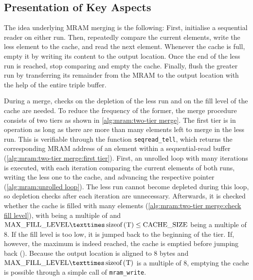 \subsection{Presentation of Key Aspects}
\label{sec:mram:merge:presentation}

The idea underlying \ac{MRAM} merging is the following:
First, initialise a sequential reader on either run.
Then, repeatedly compare the current elements, write the less element to the cache, and read the next element.
Whenever the cache is full, empty it by writing its content to the output location.
Once the end of the less run is reached, stop comparing and empty the cache.
Finally, flush the greater run by transferring its remainder from the \ac{MRAM} to the output location with the help of the entire triple buffer.

During a merge, checks on the depletion of the less run and on the fill level of the cache are needed.
To reduce the frequency of the former, the merge procedure consists of two tiers as shown in \cref{alg:mram:two-tier merge}.
The first tier is in operation as long as there are more than \unrollfactor{} many elements left to merge in the less run.
This is verifiable through the function \lstinline|seqread_tell|, which returns the corresponding \ac{MRAM} address of an element within a sequential-read buffer (\cref{alg:mram:two-tier merge:first tier}).
First, an unrolled loop with \unrollfactor{} many iterations is executed, with each iteration comparing the current elements of both runs, writing the less one to the cache, and advancing the respective pointer (\cref{alg:mram:unrolled loop}).
The less run cannot become depleted during this loop, so depletion checks after each iteration are unnecessary.
Afterwards, it is checked whether the cache is filled with \unrolledcachelength{} many elements (\cref{alg:mram:two-tier merge:check fill level}), with \unrolledcachelength{} being a multiple of \unrollfactor{} and \(\unrolledcachelength{} × \text{\lstinline[keywords={}]|sizeof(T)|} \le \cachesize{}\) being a multiple of 8.
If the fill level is too low, it is jumped back to the beginning of the tier.
If, however, the maximum is indeed reached, the cache is emptied before jumping back ().
Because the output location is aligned to 8 bytes and \(\unrolledcachelength{} × \text{\lstinline[keywords={}]|sizeof(T)|}\) is a multiple of 8, emptying the cache is possible through a simple call of \lstinline|mram_write|.

